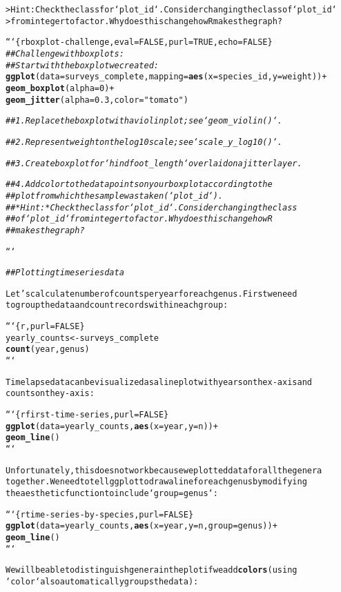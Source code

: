 \documentclass{article}\usepackage[]{graphicx}\usepackage[]{xcolor}
\makeatletter
\newcommand{\hlstr}[1]{\textcolor[rgb]{0.192,0.494,0.8}{#1}}%
\newcommand{\hlcom}[1]{\textcolor[rgb]{0.678,0.584,0.686}{\textit{#1}}}%
\newcommand{\hlkwd}[1]{\textcolor[rgb]{0.737,0.353,0.396}{\textbf{#1}}}%
\newenvironment{kframe}{%
 \def\at@end@of@kframe{}%
 \ifinner\ifhmode%
  \def\at@end@of@kframe{\end{minipage}}%
  \begin{minipage}{\columnwidth}%
 \fi\fi%
 \def\FrameCommand##1{\hskip\@totalleftmargin \hskip-\fboxsep
 \colorbox{shadecolor}{##1}\hskip-\fboxsep
     \hskip-\linewidth \hskip-\@totalleftmargin \hskip\columnwidth}%
 \MakeFramed {\advance\hsize-\width
   \@totalleftmargin\z@ \linewidth\hsize
   \@setminipage}}%
 {\par\unskip\endMakeFramed%
 \at@end@of@kframe}
\newenvironment{knitrout}{}{} %
\makeatother
\begin{document}
\begin{knitrout}
\begin{kframe}
\begin{alltt}
> Hint: Check the class for `plot_id`. Consider changing the class of `plot_id`
> from integer to factor. Why does this change how R makes the graph?

```\{r boxplot-challenge, eval = FALSE, purl = TRUE, echo = FALSE\}
\hlcom{## Challenge with boxplots:}
\hlcom{##  Start with the boxplot we created:}
\hlkwd{ggplot}(data = surveys_complete, mapping = \hlkwd{aes}(x = species_id, y = weight)) +
  \hlkwd{geom_boxplot}(alpha = 0) +
  \hlkwd{geom_jitter}(alpha = 0.3, color = \hlstr{"tomato"})

\hlcom{##  1. Replace the box plot with a violin plot; see `geom_violin()`.}

\hlcom{##  2. Represent weight on the log10 scale; see `scale_y_log10()`.}

\hlcom{##  3. Create boxplot for `hindfoot_length` overlaid on a jitter layer.}

\hlcom{##  4. Add color to the data points on your boxplot according to the}
\hlcom{##  plot from which the sample was taken (`plot_id`).}
\hlcom{##  *Hint:* Check the class for `plot_id`. Consider changing the class}
\hlcom{##  of `plot_id` from integer to factor. Why does this change how R}
\hlcom{##  makes the graph?}

```


\hlcom{## Plotting time series data}

Let's calculate number of counts per year for each genus. First we need
to group the data and count records within each group:

```\{r, purl=FALSE\}
yearly_counts <- surveys_complete %>%
  \hlkwd{count}(year, genus)
```

Timelapse data can be visualized as a line plot with years on the x-axis and
counts on the y-axis:

```\{r first-time-series, purl = FALSE\}
\hlkwd{ggplot}(data = yearly_counts, \hlkwd{aes}(x = year, y = n)) +
     \hlkwd{geom_line}()
```

Unfortunately, this does not work because we plotted data for all the genera
together. We need to tell ggplot to draw a line for each genus by modifying
the aesthetic function to include `group = genus`:

```\{r time-series-by-species, purl = FALSE\}
\hlkwd{ggplot}(data = yearly_counts, \hlkwd{aes}(x = year, y = n, group = genus)) +
    \hlkwd{geom_line}()
```

We will be able to distinguish genera in the plot if we add \hlkwd{colors} (using
`color` also automatically groups the data):


\end{alltt}
\end{kframe}
\end{knitrout}
\end{document}

